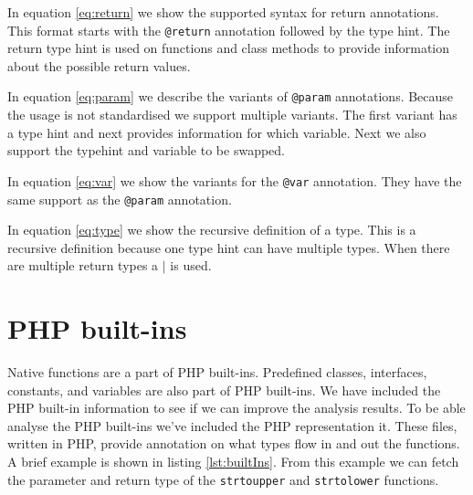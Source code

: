 \documentclass[../main.tex]{subfiles}
\begin{document}
	In equation \ref{eq:return} we show the supported syntax for return annotations.
	This format starts with the \texttt{@return} annotation followed by the type hint.
	The return type hint is used on functions and class methods to provide information about the possible return values.
	
	In equation \ref{eq:param} we describe the variants of \texttt{@param} annotations.
	Because the usage is not standardised we support multiple variants.
	The first variant has a type hint and next provides information for which variable.
	Next we also support the typehint and variable to be swapped.
	
	In equation \ref{eq:var} we show the variants for the \texttt{@var} annotation.
	They have the same support as the \texttt{@param} annotation.
	
	In equation \ref{eq:type} we show the recursive definition of a type.
	This is a recursive definition because one type hint can have multiple types.
	When there are multiple return types a $\vert{}$ is used.

	\section{PHP built-ins}\label{sec:design_php_built_ins}
	Native functions are a part of PHP built-ins.
	Predefined classes, interfaces, constants, and variables are also part of PHP built-ins.
	We have included the PHP built-in information to see if we can improve the analysis results.
	To be able analyse the PHP built-ins we've included the PHP representation it.
	These files, written in PHP, provide annotation on what types flow in and out the functions.
	A brief example is shown in listing \ref{lst:builtIns}.
	From this example we can fetch the parameter and return type of the \texttt{strtoupper} and \texttt{strtolower} functions.
	
	
	
\end{document}

